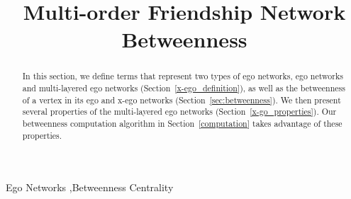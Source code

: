 \documentclass[preprint,12pt,authoryear]{elsarticle}
\theoremstyle{definition}
\begin{document}
\begin{frontmatter}



\title{Multi-order Friendship Network Betweenness}


\author{}

\address{}

\begin{abstract}
In this section, we define terms that represent two types of ego networks, ego networks and multi-layered ego networks (Section~\ref{x-ego_definition}), as well as the betweenness of a vertex in its ego and x-ego networks (Section~\ref{sec:betweenness}).
We then present several properties of the multi-layered ego networks (Section~\ref{x-go_properties}).
Our betweenness computation algorithm in Section~\ref{computation} takes advantage of these properties.


\end{abstract}

\begin{keyword}
Ego Networks \sep Betweenness Centrality



\end{keyword}

\end{frontmatter}

\end{document}
